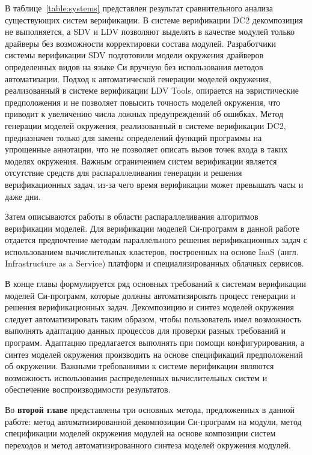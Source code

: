 \documentclass[%
autoref,
colorlinks,  
facsimile,   %
]{disser}
\begin{document}
В таблице~\ref{table:systems} представлен результат сравнительного анализа существующих систем верификации.
В системе верификации DC2 декомпозиция не выполняется, а SDV и LDV позволяют выделять в качестве модулей только драйверы без возможности корректировки состава модулей.
Разработчики системы верификации SDV подготовили модели окружения драйверов определенных видов на языке Си вручную без использования методов автоматизации.
Подход к автоматической генерации моделей окружения, реализованный в системе верификации LDV Tools, опирается на эвристические предположения и не позволяет повысить точность моделей окружения, что приводит к увеличению числа ложных предупреждений об ошибках.
Метод генерации моделей окружения, реализованный в системе верификации DC2, предназначен только для замены определений функций программы на упрощенные аннотации, что не позволяет описать вызов точек входа в таких моделях окружения.
Важным ограничением систем верификации является отсутствие средств для распараллеливания генерации и решения верификационных задач, из-за чего время верификации может превышать часы и даже дни.

Затем описываются работы в области распараллеливания алгоритмов верификации моделей.
Для верификации моделей Си-программ в данной работе отдается предпочтение методам параллельного решения верификационных задач с использованием вычислительных кластеров, построенных на основе IaaS (англ. Infrastructure as a Service) платформ и специализированных облачных сервисов.

В конце главы формулируется ряд основных требований к системам верификации моделей Си-программ, которые должны автоматизировать процесс генерации и решения верификационных задач.
Декомпозицию и синтез моделей окружения следует автоматизировать таким образом, чтобы пользователь имел возможность выполнять адаптацию данных процессов для проверки разных требований и программ.
Адаптацию предлагается выполнять при помощи конфигурирования, а синтез моделей окружения производить на основе спецификаций предположений об окружении.
Важными требованиями к системе верификации являются возможность использования распределенных вычислительных систем и обеспечение воспроизводимости результатов.

Во \textbf{второй главе} представлены три основных метода, предложенных в данной работе: метод автоматизированной декомпозиции Си-программ на модули, метод спецификации моделей окружения модулей на основе композиции систем переходов и метод автоматизированного синтеза моделей окружения модулей.
\end{document}

